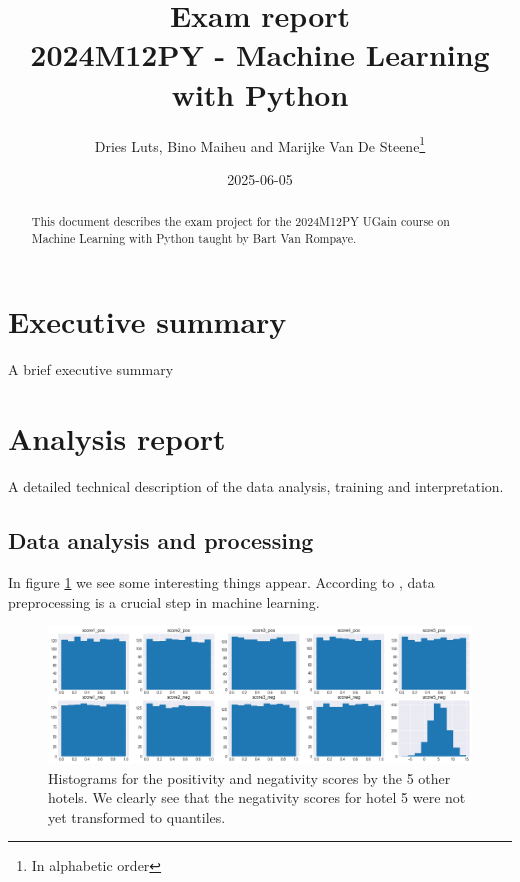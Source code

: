 \documentclass[a4paper]{article}
\begin{document}
\title{Exam report\\2024M12PY - Machine Learning with Python}
\author{Dries Luts, Bino Maiheu and Marijke Van De Steene\footnote{In alphabetic order}}
\date{2025-06-05}
\maketitle

\begin{abstract}
This document describes the exam project for the 2024M12PY UGain course on Machine Learning with Python taught by Bart Van Rompaye.
\end{abstract}


\section{Executive summary}

A brief executive summary

\section{Analysis report}

A detailed technical description of the data analysis, training and interpretation. 

\subsection{Data analysis and processing}

In figure \ref{fig:score_histograms} we see some interesting things appear. According to \citet{bishop2006pattern}, data preprocessing is a crucial step in machine learning.

\begin{figure}[!h]
    \centering
    \includegraphics[width=1.0\textwidth]{figs/score_histograms.png}
    \caption{Histograms for the positivity and negativity scores by the 5 other hotels. We clearly see
    that the negativity scores for hotel 5 were not yet transformed to quantiles.}
    \label{fig:score_histograms}
\end{figure}
\end{document}

